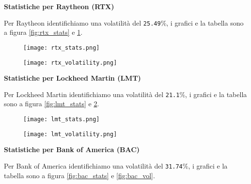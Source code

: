 \pagebreak

\textbf{Statistiche per Raytheon (RTX)}

Per Raytheon identifichiamo una volatilità del \verb|25.49|\%, i grafici e la tabella sono a figura \ref{fig:rtx_stats} e \ref{fig:rtx_vol}.

\begin{figure}[h]
  \centering
  \begin{minipage}{.5\textwidth}
    \centering
    \vspace{4.85cm}
    \texttt{[image: rtx\_stats.png]}
    \label{fig:rtx_stats}
  \end{minipage}%
  \begin{minipage}{.5\textwidth}
    \centering
    \texttt{[image: rtx\_volatility.png]}
    \label{fig:rtx_vol}
  \end{minipage}
\end{figure}

\textbf{Statistiche per Lockheed Martin (LMT)}

Per Lockheed Martin identifichiamo una volatilità del \verb|21.1|\%, i grafici e la tabella sono a figura \ref{fig:lmt_stats} e \ref{fig:lmt_vol}.

\begin{figure}[h]
  \centering
  \begin{minipage}{.5\textwidth}
    \centering
    \vspace{4.35cm}
    \texttt{[image: lmt\_stats.png]}
    \label{fig:lmt_stats}
  \end{minipage}%
  \begin{minipage}{.5\textwidth}
    \centering
    \texttt{[image: lmt\_volatility.png]}
    \label{fig:lmt_vol}
  \end{minipage}
\end{figure}

\pagebreak

\textbf{Statistiche per Bank of America (BAC)}

Per Bank of America identifichiamo una volatilità del \verb|31.74|\%, i grafici e la tabella sono a figura \ref{fig:bac_stats} e \ref{fig:bac_vol}.


